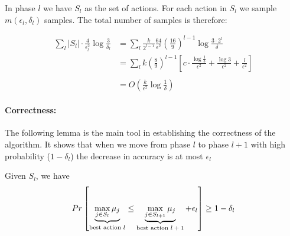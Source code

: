 In phase $l$ we have $S_l$ as the set of actions. For each action in $S_l$ we sample $m(\epsilon_l,\delta_l)$ samples.
The total number of samples is therefore:

\begin{align*}
 \sum_l |S_l| \cdot \frac{4}{\epsilon_l^2}\log \frac{3}{\delta_l} &=
\sum_{l}\frac{k}{2^{l-1}}\frac{64}{\epsilon^{2}}\left(\frac{16}{9}\right)^{l-1}\log\frac{3\cdot2^{l}}{\delta}\\
& =  {\displaystyle \sum_{l}k\left(\frac{8}{9}\right)^{l-1}\left[c\cdot\frac{\log\frac{1}{\delta}}{\epsilon^{2}}+\frac{\log3}{\epsilon^{2}}+\frac{l}{\epsilon^{2}}\right]}\\
\\
 & =  O\left(\frac{k}{\epsilon^{2}}\log\frac{1}{\delta}\right)
\end{align*}


\paragraph{Correctness:}
The following lemma is the main tool in establishing the correctness of the algorithm. It shows that when we move from phase $l$ to phase $l+1$ with high probability ($1-\delta_l$) the decrease in accuracy is at most $\epsilon_l$

\begin{lemma}
Given $S_l$, we have 
$$Pr\left[\underbrace{{\displaystyle \max_{j\in
S_{l}}\mu_{j}}}_{\text{best action
\ensuremath{l}}}\le\underbrace{{\displaystyle \max_{j\in
S_{l+1}}\mu_{j}}}_{\text{best action
\ensuremath{l+1}}}+\epsilon_{l}\right]\ge1-\delta_{l}$$
\end{lemma}

